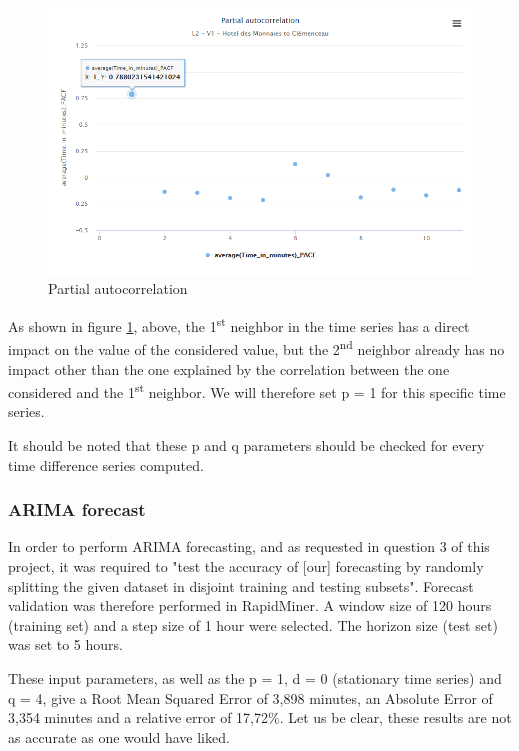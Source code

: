 \documentclass{article}
\begin{document}
 \begin{figure}[H]
    \centering
    \includegraphics[width=\textwidth]{images/Fig5.png} 
    \caption{Partial autocorrelation}
    \label{fig:part-autocor}
\end{figure}

 As shown in figure \ref{fig:part-autocor}, above, the 1\textsuperscript{st} neighbor in the time series has a direct impact on the value of the considered value, but the 2\textsuperscript{nd} neighbor already has no impact other than the one explained by the correlation between the one considered and the 1\textsuperscript{st} neighbor. We will therefore set p = 1 for this specific time series.
 
It should be noted that these p and q parameters should be checked for every time difference series computed.

\subsubsection{ARIMA forecast}
In order to perform ARIMA forecasting, and as requested in question 3 of this project, it was required to "test the accuracy of [our] forecasting by randomly splitting the given dataset in disjoint training and testing subsets". Forecast validation was therefore performed in RapidMiner. A window size of 120 hours (training set) and a step size of 1 hour were selected. The horizon size (test set) was set to 5 hours.

These input parameters, as well as the p = 1, d = 0 (stationary time series) and q = 4, give a Root Mean Squared Error of 3,898 minutes, an Absolute Error of 3,354 minutes and a relative error of 17,72\%. Let us be clear, these results are not as accurate as one would have liked.
\end{document}
